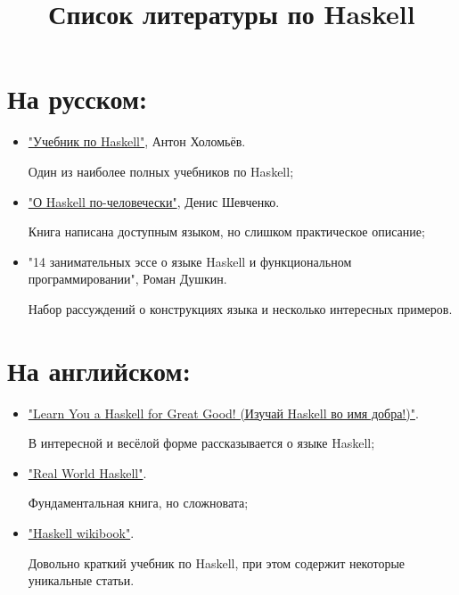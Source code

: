 \documentclass[a4paper,10pt]{article}
\begin{document}
\setcounter{secnumdepth}{0}
\title{Список литературы по Haskell}
\date{}
\maketitle
\section{На русском:}
\begin{itemize}
\item {
\href{https://anton-k.github.io/ru-haskell-book/book/home.html}{"Учебник по Haskell"}, Антон Холомьёв.

Один из наиболее полных учебников по Haskell;
}

\item {
\href{https://www.ohaskell.guide/}{"О Haskell по-человечески"}, Денис Шевченко.

Книга написана доступным языком, но слишком практическое описание;
}

\item {
"14 занимательных эссе о языке Haskell и функциональном программировании"{}, Роман Душкин.

Набор рассуждений о конструкциях языка и несколько интересных примеров.
}
\end{itemize}


\section{На английском:}
\begin{itemize}
\item {
\href{http://learnyouahaskell.com/chapters}{"Learn You a Haskell for Great Good! (Изучай Haskell во имя добра!)"}.

В интересной и весёлой форме рассказывается о языке Haskell;
}

\item {
\href{http://book.realworldhaskell.org/read/}{"Real World Haskell"}.

Фундаментальная книга, но сложновата;
}

\item {
\href{https://en.wikibooks.org/wiki/Haskell}{"Haskell wikibook"}.

Довольно краткий учебник по Haskell, при этом содержит некоторые уникальные статьи.
}
\end{itemize}
\end{document}
